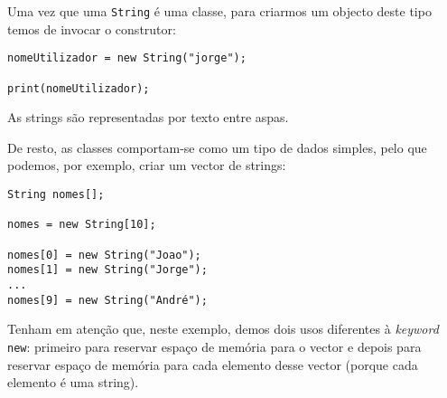 Uma vez que uma \texttt{String} é uma classe, para criarmos um objecto deste tipo temos de invocar o construtor:
\begin{lstlisting}
nomeUtilizador = new String("jorge");

print(nomeUtilizador);
\end{lstlisting}
As strings são representadas por texto entre aspas.

De resto, as classes comportam-se como um tipo de dados simples, pelo que podemos, por exemplo, criar um vector de strings:
\begin{lstlisting}
String nomes[];

nomes = new String[10];

nomes[0] = new String("Joao");
nomes[1] = new String("Jorge");
...
nomes[9] = new String("André");
\end{lstlisting}
Tenham em atenção que, neste exemplo, demos dois usos diferentes à \emph{keyword} \texttt{new}: primeiro para reservar espaço de memória para o vector e depois para reservar espaço de memória para cada elemento desse vector (porque cada elemento é uma string).